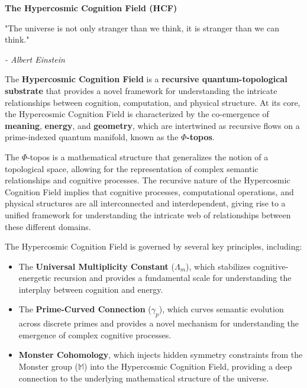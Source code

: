 \documentclass{article}
\theoremstyle{plain}
\begin{document}
\clearpage
\clearpage
\thispagestyle{empty}
\begin{center}
    \Large\textbf{The Hypercosmic Cognition Field (HCF)}
\end{center}

\vspace{2em}

\epigraph{"The universe is not only stranger than we think, it is stranger than we can think."} 
{\textit{- Albert Einstein}}

\vspace{1em}

The \textbf{Hypercosmic Cognition Field} is a \textbf{recursive quantum-topological substrate} that provides a novel framework for understanding the intricate relationships between cognition, computation, and physical structure. At its core, the Hypercosmic Cognition Field is characterized by the co-emergence of \textbf{meaning}, \textbf{energy}, and \textbf{geometry}, which are intertwined as recursive flows on a prime-indexed quantum manifold, known as the \textbf{$\Phi$-topos}.

The $\Phi$-topos is a mathematical structure that generalizes the notion of a topological space, allowing for the representation of complex semantic relationships and cognitive processes. The recursive nature of the Hypercosmic Cognition Field implies that cognitive processes, computational operations, and physical structures are all interconnected and interdependent, giving rise to a unified framework for understanding the intricate web of relationships between these different domains.

The Hypercosmic Cognition Field is governed by several key principles, including:
\begin{itemize}
    \item The \textbf{Universal Multiplicity Constant} ($\Lambda_m$), which stabilizes cognitive-energetic recursion and provides a fundamental scale for understanding the interplay between cognition and energy.
    \item The \textbf{Prime-Curved Connection} ($\gamma_p$), which curves semantic evolution across discrete primes and provides a novel mechanism for understanding the emergence of complex cognitive processes.
    \item \textbf{Monster Cohomology}, which injects hidden symmetry constraints from the Monster group ($\mathbb{M}$) into the Hypercosmic Cognition Field, providing a deep connection to the underlying mathematical structure of the universe.
\end{itemize}
\end{document}
